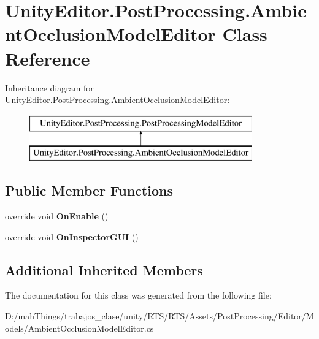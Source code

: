 \hypertarget{class_unity_editor_1_1_post_processing_1_1_ambient_occlusion_model_editor}{}\section{Unity\+Editor.\+Post\+Processing.\+Ambient\+Occlusion\+Model\+Editor Class Reference}
\label{class_unity_editor_1_1_post_processing_1_1_ambient_occlusion_model_editor}
Inheritance diagram for Unity\+Editor.\+Post\+Processing.\+Ambient\+Occlusion\+Model\+Editor\+:\begin{figure}[H]
\begin{center}
\leavevmode
\includegraphics[height=2.000000cm]{class_unity_editor_1_1_post_processing_1_1_ambient_occlusion_model_editor}
\end{center}
\end{figure}
\subsection*{Public Member Functions}
\begin{DoxyCompactItemize}
\item 
\mbox{\label{class_unity_editor_1_1_post_processing_1_1_ambient_occlusion_model_editor_a7985bbb79187976b1e90cdb401800e2f}} 
override void {\bfseries On\+Enable} ()
\item 
\mbox{\label{class_unity_editor_1_1_post_processing_1_1_ambient_occlusion_model_editor_a088ca4292c297130b6d86b22357c1c41}} 
override void {\bfseries On\+Inspector\+G\+UI} ()
\end{DoxyCompactItemize}
\subsection*{Additional Inherited Members}


The documentation for this class was generated from the following file\+:\begin{DoxyCompactItemize}
\item 
D\+:/mah\+Things/trabajos\+\_\+clase/unity/\+R\+T\+S/\+R\+T\+S/\+Assets/\+Post\+Processing/\+Editor/\+Models/Ambient\+Occlusion\+Model\+Editor.\+cs\end{DoxyCompactItemize}
